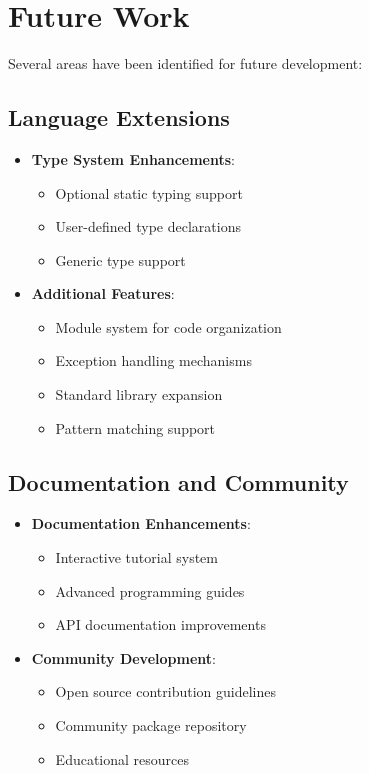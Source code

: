 \documentclass[11pt]{article}
\newenvironment{feature}
{\begin{tcolorbox}[
    colback=lightgray,
    colframe=primary,
    arc=0mm,
    boxrule=1pt
]}
{\end{tcolorbox}}
\begin{document}
\section{Future Work}
\begin{feature}
Several areas have been identified for future development:

\subsection*{Language Extensions}
\begin{itemize}[label=\textcolor{primary}{\faArrowRight}]
    \item \textbf{Type System Enhancements}:
    \begin{itemize}[label=\textcolor{secondary}{\faAngleRight}]
        \item Optional static typing support
        \item User-defined type declarations
        \item Generic type support
    \end{itemize}
    
    \item \textbf{Additional Features}:
    \begin{itemize}[label=\textcolor{secondary}{\faAngleRight}]
        \item Module system for code organization
        \item Exception handling mechanisms
        \item Standard library expansion
        \item Pattern matching support
    \end{itemize}
\end{itemize}

\subsection*{Documentation and Community}
\begin{itemize}[label=\textcolor{primary}{\faArrowRight}]
    \item \textbf{Documentation Enhancements}:
    \begin{itemize}[label=\textcolor{secondary}{\faAngleRight}]
        \item Interactive tutorial system
        \item Advanced programming guides
        \item API documentation improvements
    \end{itemize}
    
    \item \textbf{Community Development}:
    \begin{itemize}[label=\textcolor{secondary}{\faAngleRight}]
        \item Open source contribution guidelines
        \item Community package repository
        \item Educational resources
    \end{itemize}
\end{itemize}
\end{feature}
\end{document}

